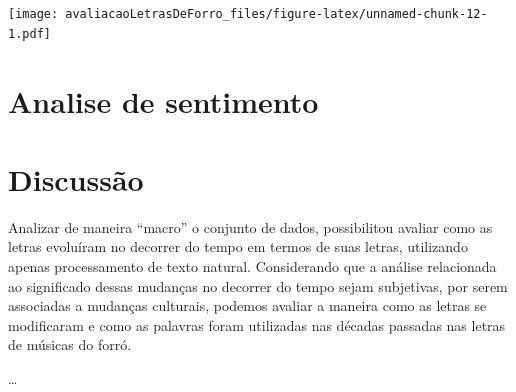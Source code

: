 \documentclass[]{article}
\newenvironment{Shaded}{\begin{snugshade}}{\end{snugshade}}
\newcommand{\DataTypeTok}[1]{\textcolor[rgb]{0.13,0.29,0.53}{#1}}
\newcommand{\DecValTok}[1]{\textcolor[rgb]{0.00,0.00,0.81}{#1}}
\newcommand{\FloatTok}[1]{\textcolor[rgb]{0.00,0.00,0.81}{#1}}
\newcommand{\KeywordTok}[1]{\textcolor[rgb]{0.13,0.29,0.53}{\textbf{#1}}}
\newcommand{\NormalTok}[1]{#1}
\newcommand{\OperatorTok}[1]{\textcolor[rgb]{0.81,0.36,0.00}{\textbf{#1}}}
\newcommand{\StringTok}[1]{\textcolor[rgb]{0.31,0.60,0.02}{#1}}
\begin{document}
\begin{Shaded}
\end{Shaded}

\texttt{[image: avaliacaoLetrasDeForro\_files/figure-latex/unnamed-chunk-12-1.pdf]}

\hypertarget{analise-de-sentimento}{%
\section{Analise de sentimento }\label{analise-de-sentimento}}

\hypertarget{discussao}{%
\section{Discussão}\label{discussao}}

Analizar de maneira ``macro'' o conjunto de dados, possibilitou avaliar
como as letras evoluíram no decorrer do tempo em termos de suas letras,
utilizando apenas processamento de texto natural. Considerando que a
análise relacionada ao significado dessas mudanças no decorrer do tempo
sejam subjetivas, por serem associadas a mudanças culturais, podemos
avaliar a maneira como as letras se modificaram e como as palavras foram
utilizadas nas décadas passadas nas letras de músicas do forró.

\ldots{}
\end{document}
